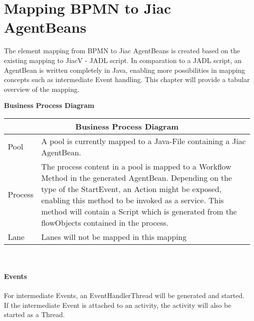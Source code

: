 \chapter{Mapping BPMN to Jiac AgentBeans}

The element mapping from BPMN to Jiac AgentBeans is created based on the existing mapping to JiacV - JADL script. In comparation to a JADL script, an AgentBean is written completely in Java, enabling more possibilities in mapping concepts such as intermediate Event handling. This chapter will provide a tabular overview of the mapping. 

\textbf{\large{Business Process Diagram}}

		\begin{tabularx}{\linewidth}{|l|X|}\hline\hline
			\multicolumn{2}{|c|}{\textbf{Business Process Diagram}} \\\hline\hline
			 Pool & A pool is currently mapped to a Java-File containing a Jiac AgentBean.\\\hline
			 Process & The process content in a pool is mapped to a Workflow Method in the generated AgentBean. Depending on the type of the StartEvent, an Action might be exposed, enabling this method to be invoked as a service. This method will contain a Script which is generated from the flowObjects contained in the process.\\\hline
			 Lane & Lanes will not be mapped in this mapping\\\hline \hline
		\end{tabularx}\\\\

\textbf{\Large{Events}}\\\\
For intermediate Events, an EventHandlerThread will be generated and started. If the intermediate Event is attached to an activity, the activity will also be started as a Thread. 

